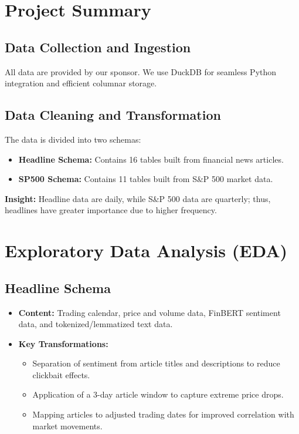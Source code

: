 \documentclass[twocolumn]{article}
\begin{document}
\section{Project Summary}
\subsection{Data Collection and Ingestion}
All data are provided by our sponsor. We use DuckDB for seamless Python integration and efficient columnar storage.

\subsection{Data Cleaning and Transformation}
The data is divided into two schemas:
\begin{itemize}
    \item \textbf{Headline Schema:} Contains 16 tables built from financial news articles.
    \item \textbf{SP500 Schema:} Contains 11 tables built from S\&P 500 market data.
\end{itemize}
\textbf{Insight:} Headline data are daily, while S\&P 500 data are quarterly; thus, headlines have greater importance due to higher frequency.

\section{Exploratory Data Analysis (EDA)}
\subsection{Headline Schema}
\begin{itemize}
    \item \textbf{Content:} Trading calendar, price and volume data, FinBERT sentiment data, and tokenized/lemmatized text data.
    \item \textbf{Key Transformations:}
    \begin{itemize}
        \item Separation of sentiment from article titles and descriptions to reduce clickbait effects.
        \item Application of a 3-day article window to capture extreme price drops.
        \item Mapping articles to adjusted trading dates for improved correlation with market movements.
    \end{itemize}
\end{itemize}
\end{document}
